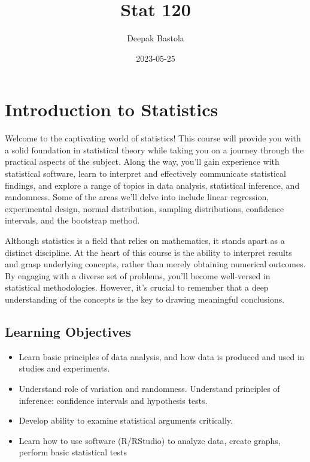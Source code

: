 \documentclass[
]{book}
\title{Stat 120}
\author{Deepak Bastola}
\date{2023-05-25}
\begin{document}
\maketitle

{
\setcounter{tocdepth}{1}
\tableofcontents
}
\hypertarget{introduction-to-statistics}{%
\chapter*{Introduction to Statistics}\label{introduction-to-statistics}}

Welcome to the captivating world of statistics! This course will provide you with a solid foundation in statistical theory while taking you on a journey through the practical aspects of the subject. Along the way, you'll gain experience with statistical software, learn to interpret and effectively communicate statistical findings, and explore a range of topics in data analysis, statistical inference, and randomness. Some of the areas we'll delve into include linear regression, experimental design, normal distribution, sampling distributions, confidence intervals, and the bootstrap method.

Although statistics is a field that relies on mathematics, it stands apart as a distinct discipline. At the heart of this course is the ability to interpret results and grasp underlying concepts, rather than merely obtaining numerical outcomes. By engaging with a diverse set of problems, you'll become well-versed in statistical methodologies. However, it's crucial to remember that a deep understanding of the concepts is the key to drawing meaningful conclusions.

\hypertarget{learning-objectives}{%
\section{Learning Objectives}\label{learning-objectives}}

\begin{itemize}
\item
  Learn basic principles of data analysis, and how data is produced and used in studies and experiments.
\item
  Understand role of variation and randomness. Understand principles of inference: confidence intervals and hypothesis tests.
\item
  Develop ability to examine statistical arguments critically.
\item
  Learn how to use software (R/RStudio) to analyze data, create graphs, perform basic statistical tests
\end{itemize}
\end{document}
